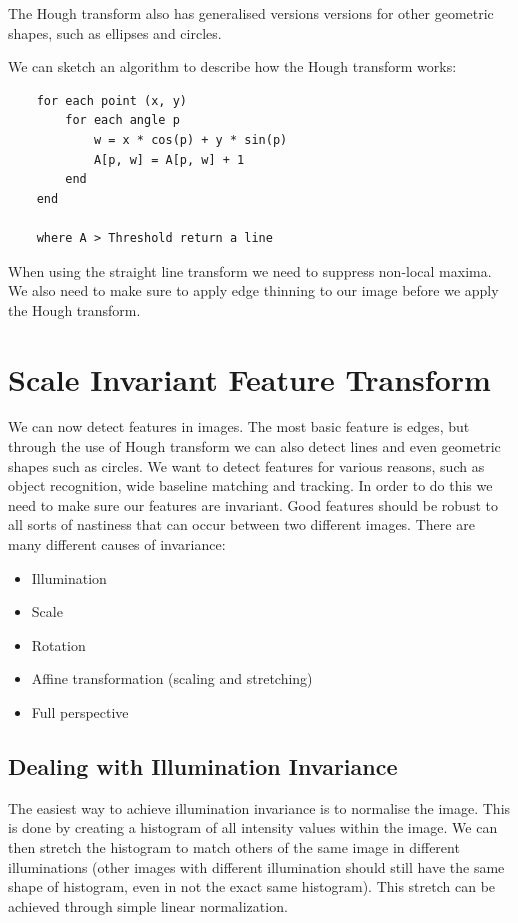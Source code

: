 \documentclass{article}
\begin{document}
	The Hough transform also has generalised versions versions for other geometric shapes, such as ellipses and circles.
	
	\par 
	We can sketch an algorithm to describe how the Hough transform works:
	
	\begin{verbatim}
	for each point (x, y)
	    for each angle p
	        w = x * cos(p) + y * sin(p)
	        A[p, w] = A[p, w] + 1
	    end
	end
	
	where A > Threshold return a line
	\end{verbatim}
	
	When using the straight line transform we need to suppress non-local maxima. We also need to make sure to apply edge thinning to our image before we apply the Hough transform.
	
	\section{Scale Invariant Feature Transform}
	We can now detect features in images. The most basic feature is edges, but through the use of Hough transform we can also detect lines and even geometric shapes such as circles. We want to detect features for various reasons, such as object recognition, wide baseline matching and tracking. In order to do this we need to make sure our features are invariant. Good features should be robust to all sorts of nastiness that can occur between two different images. There are many different causes of invariance:
	\begin{itemize}
		\item Illumination
		\item Scale
		\item Rotation
		\item Affine transformation (scaling and stretching)
		\item Full perspective
	\end{itemize}
	
	\subsection{Dealing with Illumination Invariance}
	The easiest way to achieve illumination invariance is to normalise the image. This is done by creating a histogram of all intensity values within the image. We can then stretch the histogram to match others of the same image in different illuminations (other images with different illumination should still have the same shape of histogram, even in not the exact same histogram). This stretch can be achieved through simple linear normalization.
	
\end{document}
